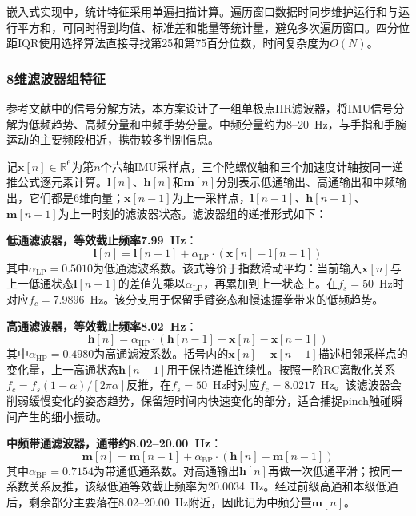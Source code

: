 \documentclass[lettersize,journal]{IEEEtran}
\begin{document}
嵌入式实现中，统计特征采用单遍扫描计算。遍历窗口数据时同步维护运行和与运行平方和，可同时得到均值、标准差和能量等统计量，避免多次遍历窗口。四分位距IQR使用选择算法直接寻找第25和第75百分位数，时间复杂度为$O(N)$。

\subsubsection{8维滤波器组特征}

参考文献\cite{xu2022enabling}中的信号分解方法，本方案设计了一组单极点IIR滤波器，将IMU信号分解为低频趋势、高频分量和中频手势分量。中频分量约为8--20~Hz，与手指和手腕运动的主要频段相近，携带较多判别信息。

记$\mathbf{x}[n]\in\mathbb{R}^{6}$为第$n$个六轴IMU采样点，三个陀螺仪轴和三个加速度计轴按同一递推公式逐元素计算。$\mathbf{l}[n]$、$\mathbf{h}[n]$和$\mathbf{m}[n]$分别表示低通输出、高通输出和中频输出，它们都是6维向量；$\mathbf{x}[n-1]$为上一采样点，$\mathbf{l}[n-1]$、$\mathbf{h}[n-1]$、$\mathbf{m}[n-1]$为上一时刻的滤波器状态。滤波器组的递推形式如下：

\textbf{低通滤波器，等效截止频率7.99~Hz}：
\begin{equation}
    \mathbf{l}[n] = \mathbf{l}[n-1] + \alpha_\mathrm{LP} \cdot (\mathbf{x}[n] - \mathbf{l}[n-1])
\end{equation}
其中$\alpha_\mathrm{LP} = 0.5010$为低通滤波系数。该式等价于指数滑动平均：当前输入$\mathbf{x}[n]$与上一低通状态$\mathbf{l}[n-1]$的差值先乘以$\alpha_\mathrm{LP}$，再累加到上一状态上。在$f_s=50$~Hz时对应$f_c=7.9896$~Hz。该分支用于保留手臂姿态和慢速握拳带来的低频趋势。

\textbf{高通滤波器，等效截止频率8.02~Hz}：
\begin{equation}
    \mathbf{h}[n] = \alpha_\mathrm{HP} \cdot (\mathbf{h}[n-1] + \mathbf{x}[n] - \mathbf{x}[n-1])
\end{equation}
其中$\alpha_\mathrm{HP} = 0.4980$为高通滤波系数。括号内的$\mathbf{x}[n]-\mathbf{x}[n-1]$描述相邻采样点的变化量，上一高通状态$\mathbf{h}[n-1]$用于保持递推连续性。按照一阶RC离散化关系$f_c=f_s(1-\alpha)/[2\pi\alpha]$反推，在$f_s=50$~Hz时对应$f_c=8.0217$~Hz。该滤波器会削弱缓慢变化的姿态趋势，保留短时间内快速变化的部分，适合捕捉pinch触碰瞬间产生的细小振动。

\textbf{中频带通滤波器，通带约8.02--20.00~Hz}：
\begin{equation}
    \mathbf{m}[n] = \mathbf{m}[n-1] + \alpha_\mathrm{BP} \cdot (\mathbf{h}[n] - \mathbf{m}[n-1])
\end{equation}
其中$\alpha_\mathrm{BP} = 0.7154$为带通低通系数。对高通输出$\mathbf{h}[n]$再做一次低通平滑；按同一系数关系反推，该级低通等效截止频率为20.0034~Hz。经过前级高通和本级低通后，剩余部分主要落在8.02--20.00~Hz附近，因此记为中频分量$\mathbf{m}[n]$。
\end{document}
